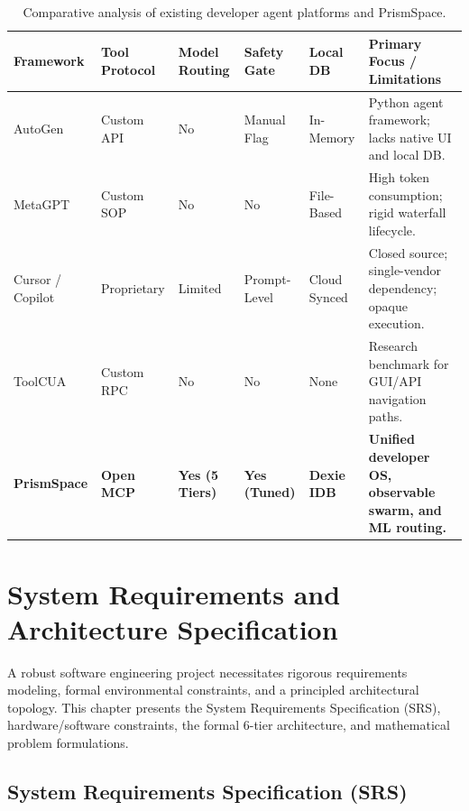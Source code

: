 \documentclass[12pt,a4paper]{report}
\begin{document}
\begin{table}[H]
\centering
\begin{singlespace}
\caption{Comparative analysis of existing developer agent platforms and PrismSpace.}
\label{tab:lit_comparison}
\footnotesize
\renewcommand{\arraystretch}{1.1}
\begin{tabularx}{\textwidth}{>{\raggedright\arraybackslash}p{2.3cm} >{\centering\arraybackslash}p{1.7cm} >{\centering\arraybackslash}p{1.7cm} >{\centering\arraybackslash}p{1.7cm} >{\centering\arraybackslash}p{1.6cm} >{\raggedright\arraybackslash}X}
\toprule
\textbf{Framework} & \textbf{Tool Protocol} & \textbf{Model Routing} & \textbf{Safety Gate} & \textbf{Local DB} & \textbf{Primary Focus / Limitations} \\
\midrule
AutoGen & Custom API & No & Manual Flag & In-Memory & Python agent framework; lacks native UI and local DB. \\
MetaGPT & Custom SOP & No & No & File-Based & High token consumption; rigid waterfall lifecycle. \\
Cursor / Copilot & Proprietary & Limited & Prompt-Level & Cloud Synced & Closed source; single-vendor dependency; opaque execution. \\
ToolCUA & Custom RPC & No & No & None & Research benchmark for GUI/API navigation paths. \\
\textbf{PrismSpace} & \textbf{Open MCP} & \textbf{Yes (5 Tiers)} & \textbf{Yes (Tuned)} & \textbf{Dexie IDB} & \textbf{Unified developer OS, observable swarm, and ML routing.} \\
\bottomrule
\end{tabularx}
\end{singlespace}
\end{table}

\chapter{System Requirements and Architecture Specification}

A robust software engineering project necessitates rigorous requirements modeling, formal environmental constraints, and a principled architectural topology. This chapter presents the System Requirements Specification (SRS), hardware/software constraints, the formal 6-tier architecture, and mathematical problem formulations.

\section{System Requirements Specification (SRS)}
\end{document}
